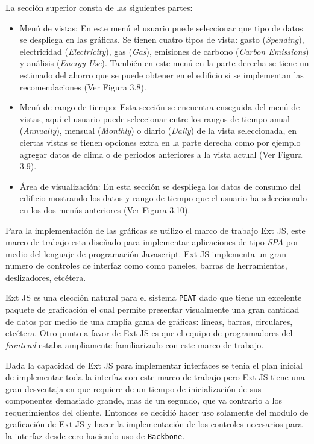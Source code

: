 La sección superior consta de las siguientes partes:
\begin{itemize}
\item Menú de vistas: En este menú el usuario puede seleccionar
  que tipo de datos se despliega en las gráficas. Se tienen cuatro tipos
  de vista: gasto (\textit{Spending}), electricidad (\textit{Electricity}), gas
  (\textit{Gas}), emisiones de carbono (\textit{Carbon Emissions}) y análisis
  (\textit{Energy Use}). También en este menú en la parte derecha se
  tiene un estimado del ahorro que se puede obtener en el edificio
  si se implementan las recomendaciones (Ver Figura 3.8).
\item Menú de rango de tiempo: Esta sección se encuentra enseguida del menú de
  vistas, aquí el usuario puede seleccionar entre los rangos de tiempo anual
  (\textit{Annually}), mensual (\textit{Monthly}) o diario (\textit{Daily}) de la
  vista seleccionada, en ciertas vistas se tienen opciones extra en la parte
  derecha como por ejemplo agregar datos de clima o de periodos anteriores
  a la vista actual (Ver Figura 3.9).
\item Área de visualización: En esta sección se despliega los datos de consumo
  del edificio mostrando los datos y rango de tiempo que el usuario ha seleccionado
  en los dos menús anteriores (Ver Figura 3.10).
\end{itemize}

Para la implementación de las gráficas se utilizo el marco de trabajo
Ext JS, este marco de trabajo esta diseñado para implementar aplicaciones
de tipo \textit{SPA} por medio del lenguaje de programación Javascript.
Ext JS implementa un gran numero de controles de interfaz como como paneles,
barras de herramientas, deslizadores, etcétera.

Ext JS es una elección natural para el sistema \texttt{PEAT} dado que tiene un
excelente paquete de graficación el cual permite presentar visualmente una gran
cantidad de datos por medio de una amplia gama de gráficas: lineas, barras,
circulares, etcétera. Otro punto a favor de Ext JS es que el equipo de programadores
del \textit{frontend} estaba ampliamente familiarizado con este marco de trabajo.

Dada la capacidad de Ext JS para implementar interfaces se tenia el plan inicial
de implementar toda la interfaz con este marco de trabajo pero Ext JS tiene una
gran desventaja en que requiere de un tiempo de inicialización de sus componentes
demasiado grande, mas de un segundo, que va contrario a los requerimientos del
cliente.
Entonces se decidió hacer uso solamente del modulo de graficación de Ext JS y
hacer la implementación de los controles necesarios para la interfaz desde cero
haciendo uso de \texttt{Backbone}.

